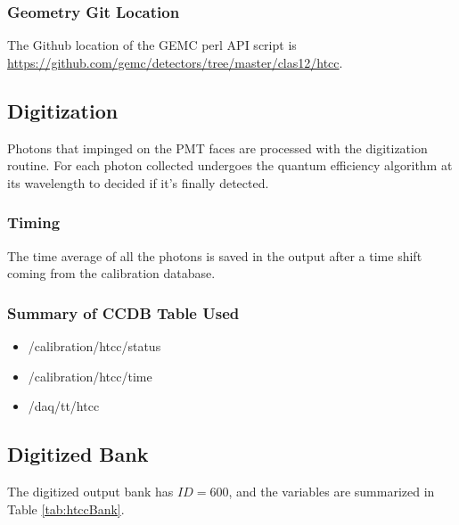\subsubsection{Geometry Git Location}
The Github location of the GEMC perl API script is \url{https://github.com/gemc/detectors/tree/master/clas12/htcc}.



\subsection{Digitization}
Photons that impinged on the PMT faces are processed with the digitization routine.
For each photon collected undergoes the quantum efficiency algorithm at its wavelength to decided if it's finally detected.

\subsubsection{Timing}

The time average of all the photons is saved in the output after a time shift coming from the calibration database.


\subsubsection{Summary of CCDB Table Used}
\begin{itemize}
	\item /calibration/htcc/status
	\item /calibration/htcc/time
	\item /daq/tt/htcc
\end{itemize}

\subsection{Digitized Bank}
The digitized output bank has $ID=600$, and the variables are summarized in Table \ref{tab:htccBank}.

